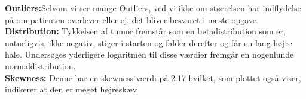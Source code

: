 \begin{enumerate}
\begin{figure}[h]
    \centering
{}\hfill
  \hfill
\end{figure}
\textbf{Outliers:}Selvom vi ser mange Outliers, ved vi ikke om størrelsen har indflydelse på om patienten overlever eller ej, det bliver besvaret i næste opgave\\
\textbf{Distribution: } Tykkelsen af tumor fremstår som en betadistribution som er, naturligvis, ikke negativ, stiger i starten og falder derefter og får en lang højre hale. Undersøges yderligere logaritmen til disse værdier fremgår en nogenlunde normaldistribution.\\
\textbf{Skewness:} Denne har en skewness værdi på 2.17 hvilket, som plottet også viser, indikerer at den er meget højreskæv


\end{enumerate}
